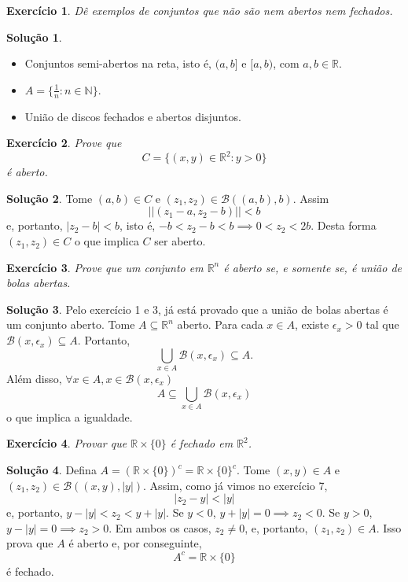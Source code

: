 \documentclass[a4paper,12pt]{article}
\newcommand{\R}{\mathbb{R}}
\newcommand{\B}{\mathcal{B}}
\theoremstyle{exer}
\newtheorem{exercise}{Exercício}
\theoremstyle{definition}
\newtheorem{solution}{Solução}
\theoremstyle{plain}
\begin{document}
\begin{exercise}
    Dê exemplos de conjuntos que não são nem abertos nem fechados.
\end{exercise}

\begin{solution}
    \begin{itemize}
        Seguem alguns
        \item Conjuntos semi-abertos na reta, isto é, $(a,b]$ e
        $[a,b)$, com $a, b \in \R$. 
        \item $A = \{\frac{1}{n} : n \in \mathbb{N}\}$.
        \item União de discos fechados e abertos disjuntos.
    \end{itemize}
\end{solution}

\begin{exercise}
    Prove que 
    $$C = \{(x, y) \in \R^2 : y > 0\}$$
    é aberto.
\end{exercise}

\begin{solution}
    Tome $(a,b) \in C$ e $(z_1, z_2) \in \B((a,b), b)$. Assim
    $$
    ||(z_1 - a, z_2 - b)|| < b
    $$
    e, portanto, $|z_2 - b| < b$, isto é, $-b < z_2 - b < b \implies 0 < z_2 <
    2b$. Desta forma $(z_1, z_2) \in C$ o que implica $C$ ser aberto. 
\end{solution}

\begin{exercise}
    Prove que um conjunto em $\R^n$ é aberto se, e somente se, é união de bolas abertas.
\end{exercise}

\begin{solution}
    Pelo exercício 1 e 3, já está provado que a união de bolas abertas é um
    conjunto aberto. Tome $A \subseteq \R^n$ aberto. Para cada $x \in A$,
    existe $\epsilon_x > 0$ tal que $\B(x, \epsilon_x) \subseteq A$. Portanto, 
    $$
    \bigcup_{x \in A} \B(x, \epsilon_x) \subseteq A. 
    $$
    Além disso, $\forall x \in A, x \in \B(x,\epsilon_x)$
    $$
    A \subseteq \bigcup_{x \in A} \B(x, \epsilon_x)
    $$
    o que implica a igualdade. 
\end{solution}

\begin{exercise}
    Provar que $\R \times \{0\}$ é fechado em $\R^2$.
\end{exercise}

\begin{solution}
    Defina $A = (\R \times \{0\})^c = \R \times \{0\}^c$.
    Tome $(x,y) \in A$ e $(z_1, z_2) \in \B((x,y), |y|)$. Assim, como já vimos no
    exercício 7, 
    $$
    |z_2 - y| < |y| 
    $$
    e, portanto, $y - |y| < z_2 < y + |y|$. Se $y < 0$, $y + |y| = 0 \implies
    z_2 < 0$. Se $y > 0$, $y - |y|  = 0 \implies z_2 > 0$. Em ambos os casos,
    $z_2 \neq 0$, e, portanto, $(z_1, z_2) \in A$. Isso prova que $A$ é aberto
    e, por conseguinte, 
    $$
    A^c = \R \times \{0\}
    $$
    é fechado. 
\end{solution}
\end{document}
